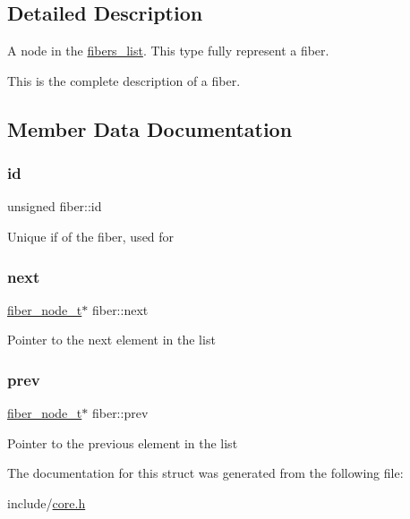 \subsection{Detailed Description}
A node in the \mbox{\hyperlink{structfibers__list}{fibers\+\_\+list}}. This type fully represent a {\ttfamily fiber}. 

This is the complete description of a fiber. 

\subsection{Member Data Documentation}
\mbox{\label{structfiber_a6301190065f177d47b2d74fa1d1240c0}} 
\subsubsection{\texorpdfstring{id}{id}}
{\footnotesize\ttfamily unsigned fiber\+::id}

Unique if of the fiber, used for \mbox{\label{structfiber_a8edc01f505460ec3df1f5319d26ee0cd}} 
\subsubsection{\texorpdfstring{next}{next}}
{\footnotesize\ttfamily \mbox{\hyperlink{core_8h_adb14c8b48a1d56cf9c6632295ab90048}{fiber\+\_\+node\+\_\+t}}$\ast$ fiber\+::next}

Pointer to the next element in the list \mbox{\label{structfiber_a327a77d565b2e0054f97b057e55b2178}} 
\subsubsection{\texorpdfstring{prev}{prev}}
{\footnotesize\ttfamily \mbox{\hyperlink{core_8h_adb14c8b48a1d56cf9c6632295ab90048}{fiber\+\_\+node\+\_\+t}}$\ast$ fiber\+::prev}

Pointer to the previous element in the list 

The documentation for this struct was generated from the following file\+:\begin{DoxyCompactItemize}
\item 
include/\mbox{\hyperlink{core_8h}{core.\+h}}\end{DoxyCompactItemize}
